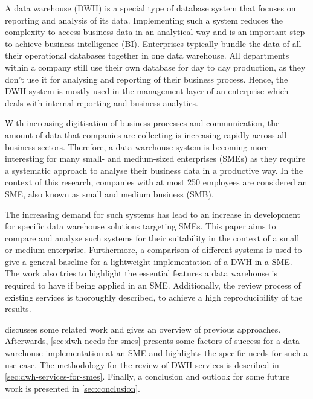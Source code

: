 \documentclass[../paper.tex]{subfiles}
\begin{document}
A data warehouse (DWH) is a special type of database system that focuses on
reporting and analysis of its data. Implementing such a system reduces the
complexity to access business data in an analytical way and is an important
step to achieve business intelligence (BI). Enterprises typically bundle the
data of all their operational databases together in one data warehouse. All
departments within a company still use their own database for day to day
production, as they don't use it for analysing and reporting of their business
process. Hence, the DWH system is mostly used in the management layer of an
enterprise which deals with internal reporting and business analytics.

With increasing digitisation of business processes and communication, the
amount of data that companies are collecting is increasing rapidly across all
business sectors. Therefore, a data warehouse system is becoming more
interesting for many small- and medium-sized enterprises (SMEs) as they require
a systematic approach to analyse their business data in a productive way. In
the context of this research, companies with at most 250 employees are
considered an SME, also known as small and medium business (SMB).

The increasing demand for such systems has lead to an increase in development
for specific data warehouse solutions targeting SMEs. This paper aims to
compare and analyse such systems for their suitability in the context of a
small or medium enterprise. Furthermore, a comparison of different systems is
used to give a general baseline for a lightweight implementation of a DWH in a
SME. The work also tries to highlight the essential features a data warehouse
is required to have if being applied in an SME. Additionally, the review
process of existing services is thoroughly described, to achieve a high
reproducibility of the results.

 discusses some related work and gives an overview of
previous approaches. Afterwards, \cref{sec:dwh-needs-for-smes} presents some
factors of success for a data warehouse implementation at an SME and highlights
the specific needs for such a use case. The methodology for the review of DWH
services is described in \cref{sec:dwh-services-for-smes}. Finally, a
conclusion and outlook for some future work is presented in
\cref{sec:conclusion}.
\end{document}
